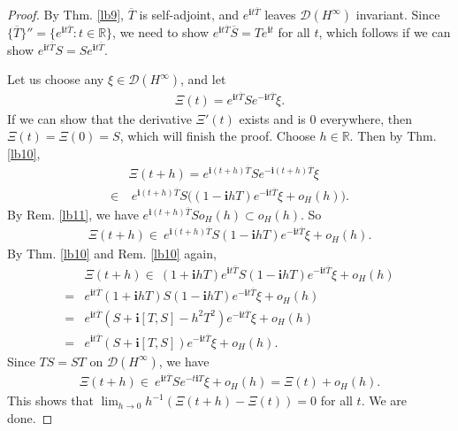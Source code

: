 \documentclass[12pt,a4paper,notitlepage]{article}
\theoremstyle{definition}
\theoremstyle{plain}
\newcommand{\ovl}{\overline}
\newcommand{\Dom}{\scr D}
\newcommand{\scr}{\mathscr}
\newcommand{\im}{\mathbf{i}}
\newcommand{\Rbb}{\mathbb R}
\numberwithin{equation}{subsection}
\begin{document}
\begin{proof}
By Thm. \ref{lb9}, $\ovl T$ is self-adjoint, and $e^{\im t\ovl T}$ leaves $\Dom(H^\infty)$ invariant. Since $\{\ovl T\}''=\{e^{\im t\ovl T}:t\in\Rbb\}$, we need to show $e^{\im t\ovl T}\ovl S=Te^{\im t}$ for all $t$, which follows if we can show $e^{\im t\ovl T}S=Se^{\im t\ovl T}$.

Let us choose any $\xi\in\Dom(H^\infty)$, and let
\begin{align*}
\Xi(t)=e^{\im t\ovl T}Se^{-\im t\ovl T}\xi.	
\end{align*}
If we can show that the derivative $\Xi'(t)$ exists and is $0$ everywhere, then $\Xi(t)=\Xi(0)=S$, which will finish the proof. Choose $h\in\Rbb$. Then by Thm. \ref{lb10},
\begin{align*}
&\Xi(t+h)=e^{\im (t+h)\ovl T}Se^{-\im(t+h)\ovl T}\xi\\
\in&~	e^{\im (t+h)\ovl T}S\big((1-\im h T) e^{-\im t\ovl T}\xi+o_H(h)\big).
\end{align*}
By Rem. \ref{lb11}, we have $e^{\im (t+h)\ovl T}So_H(h)\subset o_H(h)$. So
\begin{align*}
\Xi(t+h)\in~e^{\im (t+h)\ovl T}S(1-\im h T)e^{-\im t\ovl T}\xi+o_H(h).
\end{align*}
By Thm. \ref{lb10} and Rem. \ref{lb10} again,
\begin{align*}
&\Xi(t+h)\in~(1+\im hT)e^{\im t\ovl T}S(1-\im h T)e^{-\im t\ovl T}\xi+o_H(h)\\
=&e^{\im t\ovl T}(1+\im hT)S(1-\im h T)e^{-\im t\ovl T}\xi+o_H(h)\\
=&e^{\im t\ovl T}(S+\im[T,S]-h^2T^2)e^{-\im t\ovl T}\xi+o_H(h)\\
=&e^{\im t\ovl T}(S+\im[T,S])e^{-\im t\ovl T}\xi+o_H(h).
\end{align*}
Since $TS=ST$ on $\Dom(H^\infty)$, we have
\begin{align*}
\Xi(t+h)\in~e^{\im t\ovl T}Se^{-t\im T}	\xi+o_H(h)=\Xi(t)+o_H(h).
\end{align*}
This shows that $\lim_{h\rightarrow 0}h^{-1}(\Xi(t+h)-\Xi(t))=0$ for all $t$. We are done. 
\end{proof}






	
	

	
	
	
	
	
	
\end{document}
